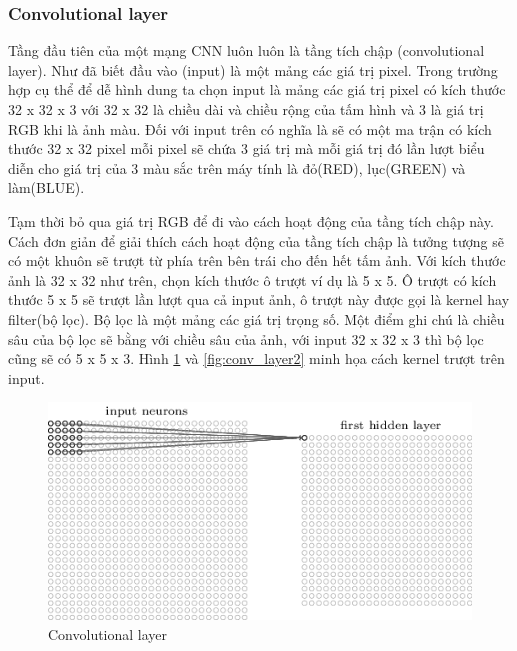 	\subsubsection{Convolutional layer}
		Tầng đầu tiên của một mạng CNN luôn luôn là tầng tích chập (convolutional layer)\cite{conv}. Như đã biết đầu vào (input) là một mảng các giá trị pixel. Trong trường hợp cụ thể để dễ hình dung ta chọn input là mảng các giá trị pixel có kích thước 32 x 32 x 3 với 32 x 32 là chiều dài và chiều rộng của tấm hình và 3 là giá trị RGB khi là ảnh màu. Đối với input trên có nghĩa là sẽ có một ma trận có kích thước 32 x 32 pixel mỗi pixel sẽ chứa 3 giá trị mà mỗi giá trị đó lần lượt biểu diễn cho giá trị của 3 màu sắc trên máy tính là đỏ(RED), lục(GREEN) và làm(BLUE). \par
		Tạm thời bỏ qua giá trị RGB để đi vào cách hoạt động của tầng tích chập này. Cách đơn giản để giải thích cách hoạt động của tầng tích chập là tưởng tượng sẽ có một khuôn sẽ trượt từ phía trên bên trái cho đến hết tấm ảnh\cite{arch}. Với kích thước ảnh là 32 x 32 như trên, chọn kích thước ô trượt ví dụ là 5 x 5. Ô trượt có kích thước 5 x 5 sẽ trượt lần lượt qua cả input ảnh, ô trượt này được gọi là kernel hay filter(bộ lọc). Bộ lọc là một mảng các giá trị trọng số. Một điểm ghi chú là chiều sâu của bộ lọc sẽ bằng với chiều sâu của ảnh, với input 32 x 32 x 3 thì bộ lọc cũng sẽ có 5 x 5 x 3. Hình \ref{fig:conv_layer1} và \ref{fig:conv_layer2} minh họa cách kernel trượt trên input.
		\begin{figure}[h!]
			\centering
			\includegraphics[scale=0.8]{charts/conv_layer1.png}
			\caption{Convolutional layer \cite{conv-layer}}
			\label{fig:conv_layer1}
		\end{figure}
		
